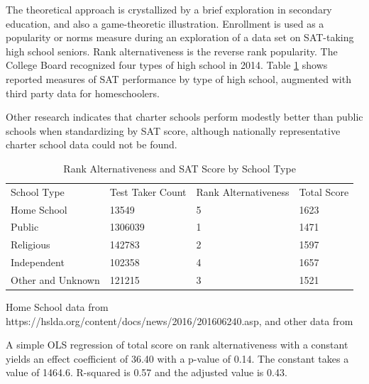 \documentclass[AER]{./aea-latex-templates/AEA}
\begin{document}
        The theoretical approach is crystallized by a brief exploration in
        secondary education, and also a game-theoretic illustration. Enrollment is used as
        a popularity or norms measure during an exploration of a data set on SAT-taking
        high school seniors. Rank alternativeness is the reverse rank popularity. The College Board recognized four types of high
        school in 2014\cite{collegeboard_2014}. Table \ref{tab:rank_alt_and_sat_by_school_type} shows reported measures of SAT performance by type of
        high school, augmented with third party data for homeschoolers\cite{mullins_2016}.
        
        Other research indicates that charter schools\cite{di2011evidence} perform modestly better than
        public schools when standardizing by SAT score, although nationally
        representative charter school data could not be found.
        
        \begin{table}
        \caption{Rank Alternativeness and SAT Score by School Type}
        \begin{tabular}{llll}
        School Type & Test Taker Count & Rank Alternativeness & Total Score \\
        Home School & 13549 & 5 & 1623 \\
        Public & 1306039 & 1 & 1471 \\
        Religious & 142783 & 2 & 1597 \\
        Independent & 102358 & 4 & 1657 \\
        Other and Unknown & 121215 & 3 & 1521 %
        \end{tabular}
        \begin{tablenotes}[Source]
        Home School data from https://hslda.org/content/docs/news/2016/201606240.asp,
        and other data from \cite{collegeboard_2014} %
        \end{tablenotes}
        \label{tab:rank_alt_and_sat_by_school_type}
        \end{table}
        
        A simple OLS regression of total score on rank alternativeness with a
        constant yields an effect coefficient of 36.40 with a p-value of 0.14. The
        constant takes a value of 1464.6. R-squared is 0.57 and the adjusted value
        is 0.43.
        
\end{document}
